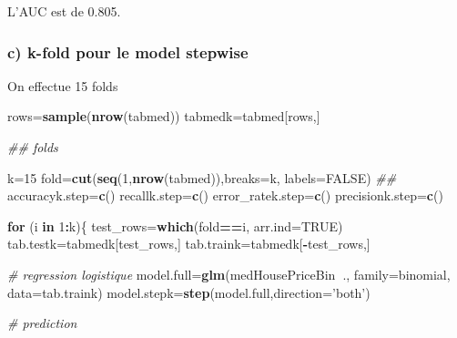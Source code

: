 \documentclass[
]{article}
\newenvironment{Shaded}{\begin{snugshade}}{\end{snugshade}}
\newcommand{\CommentTok}[1]{\textcolor[rgb]{0.56,0.35,0.01}{\textit{#1}}}
\newcommand{\ControlFlowTok}[1]{\textcolor[rgb]{0.13,0.29,0.53}{\textbf{#1}}}
\newcommand{\DataTypeTok}[1]{\textcolor[rgb]{0.13,0.29,0.53}{#1}}
\newcommand{\DecValTok}[1]{\textcolor[rgb]{0.00,0.00,0.81}{#1}}
\newcommand{\KeywordTok}[1]{\textcolor[rgb]{0.13,0.29,0.53}{\textbf{#1}}}
\newcommand{\NormalTok}[1]{#1}
\newcommand{\OperatorTok}[1]{\textcolor[rgb]{0.81,0.36,0.00}{\textbf{#1}}}
\newcommand{\OtherTok}[1]{\textcolor[rgb]{0.56,0.35,0.01}{#1}}
\newcommand{\StringTok}[1]{\textcolor[rgb]{0.31,0.60,0.02}{#1}}
\begin{document}
L'AUC est de 0.805.

\hypertarget{c-k-fold-pour-le-model-stepwise}{%
\subsubsection{c) k-fold pour le model
stepwise}\label{c-k-fold-pour-le-model-stepwise}}

On effectue 15 folds

\begin{Shaded}
\begin{Highlighting}[]
\NormalTok{rows=}\KeywordTok{sample}\NormalTok{(}\KeywordTok{nrow}\NormalTok{(tabmed))}
\NormalTok{tabmedk=tabmed[rows,]}

\CommentTok{## folds}

\NormalTok{k=}\DecValTok{15}
\NormalTok{fold=}\KeywordTok{cut}\NormalTok{(}\KeywordTok{seq}\NormalTok{(}\DecValTok{1}\NormalTok{,}\KeywordTok{nrow}\NormalTok{(tabmed)),}\DataTypeTok{breaks=}\NormalTok{k, }\DataTypeTok{labels=}\OtherTok{FALSE}\NormalTok{)}
\CommentTok{##}
\NormalTok{accuracyk.step=}\KeywordTok{c}\NormalTok{()}
\NormalTok{recallk.step=}\KeywordTok{c}\NormalTok{()}
\NormalTok{error_ratek.step=}\KeywordTok{c}\NormalTok{()}
\NormalTok{precisionk.step=}\KeywordTok{c}\NormalTok{()}

\ControlFlowTok{for}\NormalTok{ (i }\ControlFlowTok{in} \DecValTok{1}\OperatorTok{:}\NormalTok{k)\{}
\NormalTok{  test_rows=}\KeywordTok{which}\NormalTok{(fold}\OperatorTok{==}\NormalTok{i, }\DataTypeTok{arr.ind=}\OtherTok{TRUE}\NormalTok{)}
\NormalTok{  tab.testk=tabmedk[test_rows,]}
\NormalTok{  tab.traink=tabmedk[}\OperatorTok{-}\NormalTok{test_rows,]}
  
  \CommentTok{# regression logistique}
\NormalTok{  model.full=}\KeywordTok{glm}\NormalTok{(medHousePriceBin}\OperatorTok{~}\NormalTok{., }\DataTypeTok{family=}\NormalTok{binomial, }\DataTypeTok{data=}\NormalTok{tab.traink)}
\NormalTok{  model.stepk=}\KeywordTok{step}\NormalTok{(model.full,}\DataTypeTok{direction=}\StringTok{'both'}\NormalTok{)}
  
  \CommentTok{# prediction}
  

\end{Highlighting}
\end{Shaded}
\end{document}
